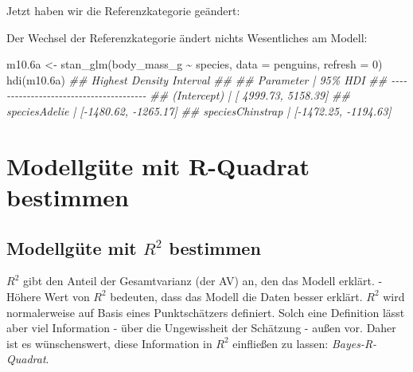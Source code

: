 \documentclass[
  a4paper,
  DIV=11]{scrreprt}
\newenvironment{Shaded}{\begin{snugshade}}{\end{snugshade}}
\newcommand{\AttributeTok}[1]{\textcolor[rgb]{0.40,0.45,0.13}{#1}}
\newcommand{\DecValTok}[1]{\textcolor[rgb]{0.68,0.00,0.00}{#1}}
\newcommand{\DocumentationTok}[1]{\textcolor[rgb]{0.37,0.37,0.37}{\textit{#1}}}
\newcommand{\FloatTok}[1]{\textcolor[rgb]{0.68,0.00,0.00}{#1}}
\newcommand{\FunctionTok}[1]{\textcolor[rgb]{0.28,0.35,0.67}{#1}}
\newcommand{\NormalTok}[1]{\textcolor[rgb]{0.00,0.23,0.31}{#1}}
\newcommand{\OtherTok}[1]{\textcolor[rgb]{0.00,0.23,0.31}{#1}}
\newcommand{\SpecialCharTok}[1]{\textcolor[rgb]{0.37,0.37,0.37}{#1}}
\theoremstyle{definition}
\theoremstyle{remark}
\begin{document}
Jetzt haben wir die Referenzkategorie geändert:

\begin{Shaded}
\end{Shaded}

Der Wechsel der Referenzkategorie ändert nichts Wesentliches am Modell:

\begin{Shaded}
\begin{Highlighting}[]
\NormalTok{m10}\FloatTok{.6}\NormalTok{a }\OtherTok{\textless{}{-}} \FunctionTok{stan\_glm}\NormalTok{(body\_mass\_g }\SpecialCharTok{\textasciitilde{}}\NormalTok{ species, }\AttributeTok{data =}\NormalTok{ penguins, }\AttributeTok{refresh =} \DecValTok{0}\NormalTok{)}
\FunctionTok{hdi}\NormalTok{(m10}\FloatTok{.6}\NormalTok{a)}
\DocumentationTok{\#\# Highest Density Interval}
\DocumentationTok{\#\# }
\DocumentationTok{\#\# Parameter        |              95\% HDI}
\DocumentationTok{\#\# {-}{-}{-}{-}{-}{-}{-}{-}{-}{-}{-}{-}{-}{-}{-}{-}{-}{-}{-}{-}{-}{-}{-}{-}{-}{-}{-}{-}{-}{-}{-}{-}{-}{-}{-}{-}{-}{-}{-}}
\DocumentationTok{\#\# (Intercept)      | [ 4999.73,  5158.39]}
\DocumentationTok{\#\# speciesAdelie    | [{-}1480.62, {-}1265.17]}
\DocumentationTok{\#\# speciesChinstrap | [{-}1472.25, {-}1194.63]}
\end{Highlighting}
\end{Shaded}

\hypertarget{modellguxfcte-mit-r-quadrat-bestimmen}{%
\section{Modellgüte mit R-Quadrat
bestimmen}\label{modellguxfcte-mit-r-quadrat-bestimmen}}

\hypertarget{modellguxfcte-mit-r2-bestimmen}{%
\subsection{\texorpdfstring{Modellgüte mit \(R^2\)
bestimmen}{Modellgüte mit R\^{}2 bestimmen}}\label{modellguxfcte-mit-r2-bestimmen}}

\(R^2\) gibt den Anteil der Gesamtvarianz (der AV) an, den das Modell
erklärt. - Höhere Wert von \(R^2\) bedeuten, dass das Modell die Daten
besser erklärt. \(R^2\) wird normalerweise auf Basis eines
Punktschätzers definiert. Solch eine Definition lässt aber viel
Information - über die Ungewissheit der Schätzung - außen vor. Daher ist
es wünschenswert, diese Information in \(R^2\) einfließen zu lassen:
\emph{Bayes-R-Quadrat}.
\end{document}
